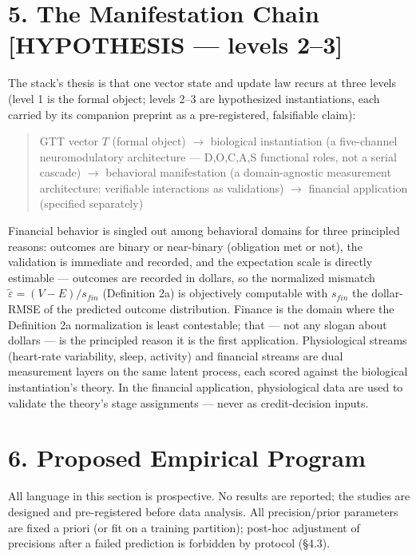 \documentclass[
]{article}
\begin{document}
\section{5. The Manifestation Chain {[}HYPOTHESIS --- levels
2--3{]}}\label{the-manifestation-chain-hypothesis-levels-23}

The stack's thesis is that one vector state and update law recurs at
three levels (level 1 is the formal object; levels 2--3 are hypothesized
instantiations, each carried by its companion preprint as a
pre-registered, falsifiable claim):

\begin{quote}
GTT vector \(T\) (formal object) \(\to\) biological instantiation (a
five-channel neuromodulatory architecture --- D,O,C,A,S functional
roles, not a serial cascade) \(\to\) behavioral manifestation (a
domain-agnostic measurement architecture: verifiable interactions as
validations) \(\to\) financial application (specified separately)
\end{quote}

Financial behavior is singled out among behavioral domains for three
principled reasons: outcomes are binary or near-binary (obligation met
or not), the validation is immediate and recorded, and the expectation
scale is directly estimable --- outcomes are recorded in dollars, so the
normalized mismatch \(\tilde{\varepsilon} = (V - E)/s_{fin}\)
(Definition 2a) is objectively computable with \(s_{fin}\) the
dollar-RMSE of the predicted outcome distribution. Finance is the domain
where the Definition 2a normalization is least contestable; that --- not
any slogan about dollars --- is the principled reason it is the first
application. Physiological streams (heart-rate variability, sleep,
activity) and financial streams are dual measurement layers on the same
latent process, each scored against the biological instantiation's
theory. In the financial application, physiological data are used to
validate the theory's stage assignments --- never as credit-decision
inputs.

\section{6. Proposed Empirical
Program}\label{proposed-empirical-program}

All language in this section is prospective. No results are reported;
the studies are designed and pre-registered before data analysis. All
precision/prior parameters are fixed a priori (or fit on a training
partition); post-hoc adjustment of precisions after a failed prediction
is forbidden by protocol (§4.3).
\end{document}
